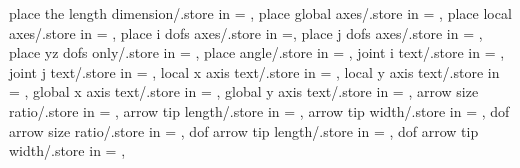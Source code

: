 {  place the length dimension/.store in = \placelengthdim,
  place global axes/.store in = \placeglobalaxes,
  place local axes/.store in = \placelocalaxes,
  place i dofs axes/.store in =\placeidofs,
  place j dofs axes/.store in = \placejdofs,
  place yz dofs only/.store in = \placeyzdofsonly,
  place angle/.store in = \placeangle,
  joint i text/.store in = \jointitext,
  joint j text/.store in = \jointjtext,
  local x axis text/.store in = \localxtext,
  local y axis text/.store in = \localytext,
  global x axis text/.store in = \globalxtext,
  global y axis text/.store in = \globalytext,
  arrow size ratio/.store in = \arrsizrat,
  arrow tip length/.store in = \arrlen,
  arrow tip width/.store in = \arrwid,
  dof arrow size ratio/.store in = \dofarrtipsizrat,
  dof arrow tip length/.store in = \dofarrtiplen,
  dof arrow tip width/.store in = \dofarrtipwid,}

